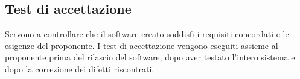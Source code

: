 \subsection{Test di accettazione}
Servono a controllare che il software creato soddisfi i requisiti concordati e le esigenze del proponente. I test di accettazione vengono eseguiti assieme al proponente prima del rilascio del software, dopo aver testato l’intero sistema e dopo la correzione dei difetti riscontrati.